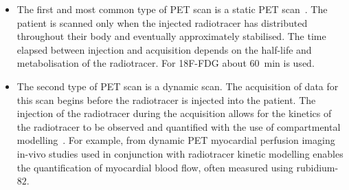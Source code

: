                 \begin{itemize}
                    \item The first and most common type of \gls{PET} scan is a static \gls{PET} scan~\parencite{Muzi2012QuantitativeImaging}. The patient is scanned only when the injected radiotracer has distributed throughout their body and eventually approximately stabilised. %
                    The time elapsed between injection and acquisition depends on the half-life and metabolisation of the radiotracer. For \gls{18F-FDG} about \SI{60}{\minute} is used.
                    
                    \item The second type of \gls{PET} scan is a dynamic scan. The acquisition of data for this scan begins before the radiotracer is injected into the patient. The injection of the radiotracer during the acquisition allows for the kinetics of the radiotracer to be observed and quantified with the use of compartmental modelling~\parencite{DynamicPETImagingLammertsma}. For example, from dynamic \gls{PET} myocardial perfusion imaging %
                    in-vivo studies used in conjunction with radiotracer kinetic modelling enables the quantification of myocardial blood flow, often measured using rubidium-$82$. %
                \end{itemize}
            
